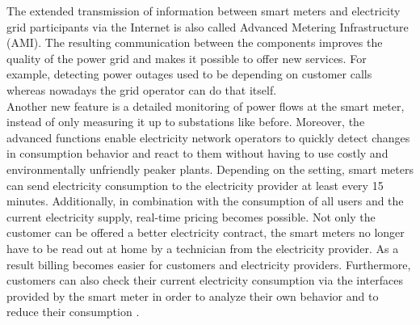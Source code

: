 The extended transmission of information between smart meters and electricity grid participants via the Internet is also called Advanced Metering Infrastructure (AMI). The resulting communication between the components improves the quality of the power grid and makes it possible to offer new services. For example, detecting power outages used to be depending on customer calls whereas nowadays the grid operator can do that itself.\\
Another new feature is a detailed monitoring of power flows at the smart meter, instead of only measuring it up to substations like before. Moreover, the advanced functions enable electricity network operators to quickly detect changes in consumption behavior and react to them without having to use costly and environmentally unfriendly peaker plants. Depending on the setting, smart meters can send electricity consumption to the electricity provider at least every 15 minutes. Additionally, in combination with the consumption of all users and the current electricity supply, real-time pricing becomes possible. Not only the customer can be offered a better electricity contract, the smart meters no longer have to be read out at home by a technician from the electricity provider. As a result billing becomes easier for customers and electricity providers. Furthermore, customers can also check their current electricity consumption via the interfaces provided by the smart meter in order to analyze their own behavior and to reduce their consumption \cite{finster2014privacy}. 
